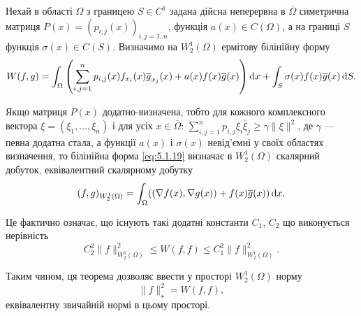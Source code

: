 Нехай в області $\Omega$ з границею $S \in C^1$ задана дійсна неперервна в $\overline{\Omega}$ симетрична матриця $P(x) = (p_{i,j}(x))_{i,j=\overline{1..n}}$, функція $a(x) \in C(\Omega)$, а на границі $S$ функція $\sigma(x) \in C(S)$. Визначимо на $W_2^1(\Omega)$ ермітову білінійну форму 
\begin{equation}
    \label{eq:5.1.19}
    W(f, g) = \int_\Omega \left( \sum_{i,j=1}^n p_{i,j}(x) f_{x_i}(x) \overline{g}_{x_j}(x) + a(x) f(x) \overline{g}(x) \right) \mathop{}\!\mathrm{d} x + \int_S \sigma(x) f(x) \overline{g}(x) \mathop{}\!\mathrm{d} S.
\end{equation}

\begin{theorem}
    Якщо матриця $P(x)$ додатно-визначена, тобто для кожного комплексного вектора $\xi = (\xi_1, \ldots, \xi_n)$ і для усіх $x \in \overline{\Omega}$: $\sum_{i,j=1}^n p_{i,j} \xi_i \overline{\xi}_j \ge \gamma \|\xi\|^2$, де $\gamma$ --- певна додатна стала, а функції $a(x)$ і $\sigma(x)$ невід'ємні у своїх областях визначення, то білінійна форма \eqref{eq:5.1.19} визначає в $W_2^1(\Omega)$ скалярний добуток, еквівалентний скалярному добутку
    \begin{equation}
        \label{eq:5.1.20}
        (f, g)_{W_2^1(\Omega)} = \int_\Omega ((\nabla f(x), \nabla g(x)) + f(x) \overline{g}(x)) \mathop{}\!\mathrm{d} x.
    \end{equation}
\end{theorem}

\begin{remark}
    Це фактично означає, що існують такі додатні константи $C_1$, $C_2$ що виконується нерівність
    \begin{equation}
        \label{eq:5.1.21}
        C_2^2 \|f\|_{W_2^1(\Omega)}^2 \le W(f, f) \le C_1^2 \|f\|_{W_2^1(\Omega)}^2.
    \end{equation}
\end{remark}

\begin{remark}
    Таким чином, ця теорема дозволяє ввести у просторі $W_2^1(\Omega)$ норму
    \begin{equation}
        \label{eq:5.1.22}
        \|f\|_\star^2 = W(f, f),
    \end{equation}
    еквівалентну звичайній нормі в цьому просторі.
\end{remark}

